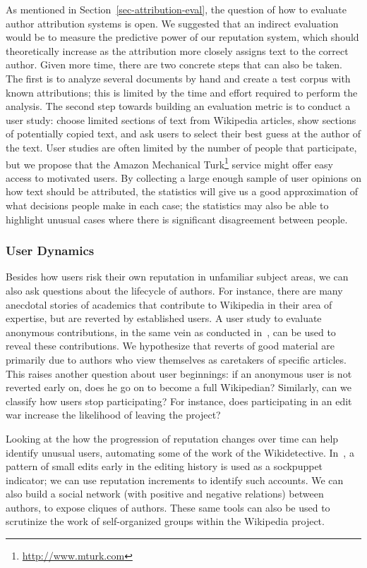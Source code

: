 As mentioned in Section~\ref{sec-attribution-eval},
the question of how to evaluate author attribution
systems is open.
We suggested that an indirect evaluation would be
to measure the predictive power of our reputation system,
which should theoretically increase as the attribution more closely
assigns text to the correct author.
Given more time, there are two concrete steps that can also be taken.
The first is to analyze several documents by hand
and create a test corpus with known attributions;
this is limited by the time and effort required to
perform the analysis.
The second step towards building an evaluation metric
is to conduct a user study:
choose limited sections of text from Wikipedia
articles, show sections of potentially copied text,
and ask users to select their best guess at the author
of the text.
User studies are often limited by the number of
people that participate, but we propose that
the Amazon Mechanical Turk\footnote{\url{http://www.mturk.com}}
service might offer easy access to motivated users.
By collecting a large enough sample of user opinions
on how text should be attributed, the statistics will
give us a good approximation of what decisions people
make in each case; the statistics may also be able to
highlight unusual cases where there is significant disagreement
between people.

\subsubsection{User Dynamics}

Besides how users risk their own reputation in
unfamiliar subject areas, we can also ask questions
about the lifecycle of authors.
For instance, there are many anecdotal stories
of academics that contribute to Wikipedia in their
area of expertise, but are reverted by established users.
A user study to evaluate anonymous contributions,
in the same vein as conducted in~\cite{www07},
can be used to reveal these contributions.
We hypothesize that reverts of good material
are primarily due to authors who view themselves
as caretakers of specific articles.
This raises another question about user beginnings:
if an anonymous user is not reverted early on,
does he go on to become a full Wikipedian?
Similarly, can we classify how users stop participating?
For instance, does participating in an edit war
increase the likelihood of leaving the project?


Looking at the how the progression of reputation
changes over time can help identify unusual users,
automating some of the work of the Wikidetective.
In~\cite{Durova2007}, a pattern of small edits early in
the editing history is used as a sockpuppet indicator;
we can use reputation increments to identify such accounts.
We can also build a social network (with positive and negative
relations) between authors, to expose cliques of authors.
These same tools can also be used to scrutinize the
work of self-organized groups within the Wikipedia project.



